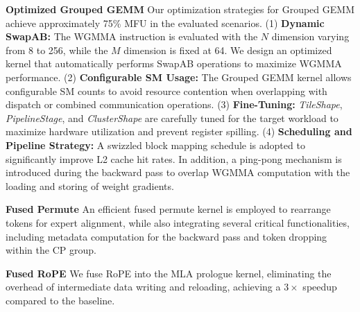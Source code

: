 \documentclass{article}
\begin{document}
\textbf{Optimized Grouped GEMM} 
Our optimization strategies for Grouped GEMM achieve approximately 75\% MFU in the evaluated scenarios. 
(1) \textbf{Dynamic SwapAB:} The WGMMA instruction is evaluated with the $N$ dimension varying from 8 to 256, while the $M$ dimension is fixed at 64. 
We design an optimized kernel that automatically performs SwapAB operations to maximize WGMMA performance. 
(2) \textbf{Configurable SM Usage:} The Grouped GEMM kernel allows configurable SM counts to avoid resource contention when overlapping with dispatch or combined communication operations. 
(3) \textbf{Fine-Tuning:} \textit{TileShape}, \textit{PipelineStage}, and \textit{ClusterShape} are carefully tuned for the target workload to maximize hardware utilization and prevent register spilling. 
(4) \textbf{Scheduling and Pipeline Strategy:} A swizzled block mapping schedule is adopted to significantly improve L2 cache hit rates. 
In addition, a ping-pong mechanism is introduced during the backward pass to overlap WGMMA computation with the loading and storing of weight gradients.


\textbf{Fused Permute} 
An efficient fused permute kernel is employed to rearrange tokens for expert alignment, while also integrating several critical functionalities, including metadata computation for the backward pass and token dropping within the CP group.


\textbf{Fused RoPE } 
We fuse RoPE into the MLA prologue kernel, eliminating the overhead of intermediate data writing and reloading, achieving a $3\times$ speedup compared to the baseline.
\end{document}
